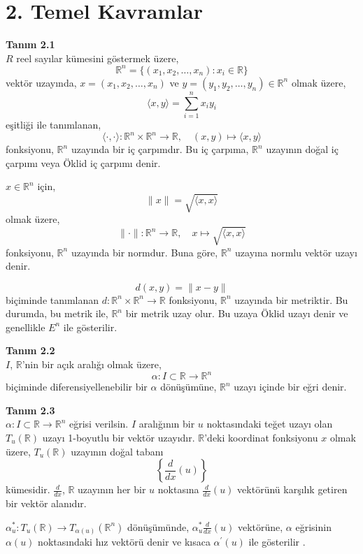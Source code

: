 \documentclass[a4paper,12pt]{article}
\begin{document}
\newpage

\section*{2. Temel Kavramlar}

\textbf{Tanım 2.1} \\
$R$ reel sayılar kümesini göstermek üzere,
\[
\mathbb{R}^n = \{(x_1, x_2, \ldots, x_n) : x_i \in \mathbb{R} \}
\]
vektör uzayında, $x = (x_1, x_2, \ldots, x_n)$ ve $y = (y_1, y_2, \ldots, y_n) \in \mathbb{R}^n$ olmak üzere,
\[
\langle x, y \rangle = \sum_{i=1}^n x_i y_i
\]
eşitliği ile tanımlanan,
\[
\langle \cdot, \cdot \rangle : \mathbb{R}^n \times \mathbb{R}^n \to \mathbb{R}, \quad (x, y) \mapsto \langle x, y \rangle
\]
fonksiyonu, $\mathbb{R}^n$ uzayında bir iç çarpımdır. Bu iç çarpıma, $\mathbb{R}^n$ uzayının doğal iç çarpımı veya Öklid iç çarpımı denir.

$x \in \mathbb{R}^n$ için,
\[
\|x\| = \sqrt{\langle x, x \rangle}
\]
olmak üzere,
\[
\|\cdot\| : \mathbb{R}^n \to \mathbb{R}, \quad x \mapsto \sqrt{\langle x, x \rangle}
\]
fonksiyonu, $\mathbb{R}^n$ uzayında bir normdur. Buna göre, $\mathbb{R}^n$ uzayına normlu vektör uzayı denir.

\[
d(x, y) = \|x - y\|
\]
biçiminde tanımlanan $d : \mathbb{R}^n \times \mathbb{R}^n \to \mathbb{R}$ fonksiyonu, $\mathbb{R}^n$ uzayında bir metriktir. Bu durumda, bu metrik ile, $\mathbb{R}^n$ bir metrik uzay olur. Bu uzaya Öklid uzayı denir ve genellikle $E^n$ ile gösterilir.

\textbf{Tanım 2.2} \\
$I$, $\mathbb{R}$'nin bir açık aralığı olmak üzere,
\[
\alpha : I \subset \mathbb{R} \to \mathbb{R}^n
\]
biçiminde diferensiyellenebilir bir $\alpha$ dönüşümüne, $\mathbb{R}^n$ uzayı içinde bir eğri denir.

\textbf{Tanım 2.3} \\ 
$\alpha : I \subset \mathbb{R} \to \mathbb{R}^n$ eğrisi verilsin. $I$ aralığının bir $u$ noktasındaki teğet uzayı olan $T_u(\mathbb{R})$ uzayı 1-boyutlu bir vektör uzayıdır. $\mathbb{R}$'deki koordinat fonksiyonu $x$ olmak üzere, $T_u(\mathbb{R})$ uzayının doğal tabanı
\[
\left\{ \frac{d}{dx}(u) \right\}
\]
kümesidir. $\frac{d}{dx}$, $\mathbb{R}$ uzayının her bir $u$ noktasına $\frac{d}{dx}(u)$ vektörünü karşılık getiren bir vektör alanıdır.



$\alpha^\ast_u : T_u(\mathbb{R}) \to T_{\alpha(u)} (\mathbb{R}^n)$ dönüşümünde, $\alpha^\ast_u \frac{d}{dx}(u)$ vektörüne, $\alpha$ eğrisinin $\alpha(u)$ noktasındaki hız vektörü denir ve kısaca $\alpha^\prime(u)$ ile gösterilir   .
\end{document}
